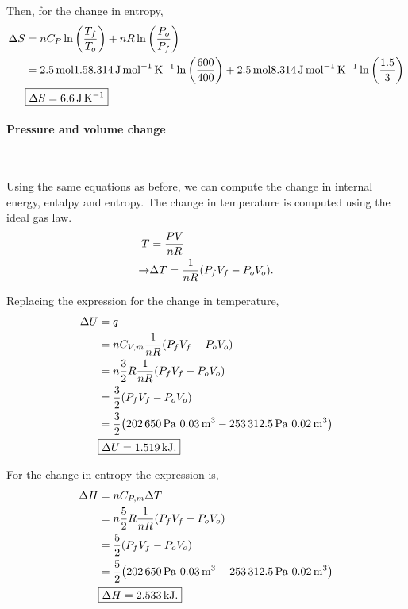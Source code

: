 \documentclass[main.tex]{subfiles}
\begin{document}
Then, for the change in entropy,
\begin{align*}
    \Delta S &= n C_P\ln\qty(\frac{T_f}{T_o}) + n R \ln\qty(\frac{P_o}{P_f}) \\ 
    &= \SI{2.5}{mol}1.5\SI{8.314}{\joule\per\mole\per\kelvin}\ln\qty(\frac{600}{400}) + \SI{2.5}{\mol}\SI{8.314}{\joule\per\mole\per\kelvin}\ln\qty(\frac{1.5}{3}) \\
    &\begin{gathered}
        \boxed{\Delta S = \SI{6.6}{\joule\per\kelvin}}
    \end{gathered}
\end{align*}

\paragraph{Pressure and volume change}~

Using the same equations as before, we can compute the change in internal energy, entalpy and entropy.
The change in temperature is computed using the ideal gas law.
\begin{align*}
    T &= \frac{PV}{nR} \\
    \rightarrow & \Delta T = \frac{1}{nR}\qty(P_fV_f - P_oV_o).
\end{align*}

Replacing the expression for the change in temperature,
\begin{align*}
    \Delta U &= q \\
    &= nC_{V,m}\frac{1}{nR}\qty(P_fV_f - P_oV_o) \\
    &= n\frac{3}{2}R\frac{1}{nR}\qty(P_fV_f - P_oV_o) \\
    &= \frac{3}{2}\qty(P_fV_f - P_oV_o) \\
    &= \frac{3}{2}\qty(\SI{202650}{\pascal}~\SI{0.03}{\meter\tothe{3}} - \SI{253312.5}{\pascal}~\SI{0.02}{\meter\tothe{3}}) \\
    &\begin{gathered}
        \boxed{\Delta U = \SI{1.519}{\kilo\joule}.}
    \end{gathered}
\end{align*}

For the change in entropy the expression is,
\begin{align*}
    \Delta H &= nC_{P,m}\Delta T \\
    &=  n\frac{5}{2}R\frac{1}{nR}\qty(P_fV_f - P_oV_o) \\
    &=  \frac{5}{2}\qty(P_fV_f - P_oV_o) \\
    &= \frac{5}{2}\qty(\SI{202650}{\pascal}~\SI{0.03}{\meter\tothe{3}} - \SI{253312.5}{\pascal}~\SI{0.02}{\meter\tothe{3}}) \\
    &\begin{gathered}
        \boxed{\Delta H = \SI{2.533}{\kilo\joule}.}
    \end{gathered}
\end{align*}
\end{document}
